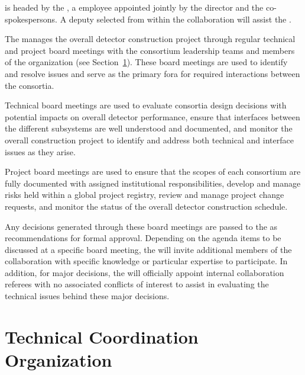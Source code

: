  is headed by the ,  a 
employee appointed jointly by the  director 
and the  co-spokespersons. %
A deputy   selected from within the collaboration will assist the .

The  manages the overall detector construction 
project through regular technical and project board meetings with 
the consortium leadership teams and members of the  
organization (see Section~\ref{sec:tco}).  These board meetings 
are used to identify and resolve issues and serve as the primary 
fora for required interactions between the consortia.

Technical board meetings are used to evaluate consortia design
decisions with potential impacts on overall detector performance,
ensure that interfaces between the different subsystems are well
understood and documented, and monitor the overall construction
project to identify and address both technical and interface 
issues as they arise.

Project board meetings are used to ensure that the scopes of 
each consortium are fully documented with assigned institutional
responsibilities, develop and manage risks held within a global
project registry, review and manage project change requests, and
monitor the status of the overall detector construction schedule.

Any decisions generated through these board meetings are passed to 
the   as recommendations for formal approval.
Depending on the agenda items to be discussed at a specific board
meeting, the  will invite additional members of the
collaboration with specific knowledge or particular expertise to
participate.  In addition, for major decisions, the 
will officially appoint internal collaboration referees with no associated 
conflicts of interest to %
assist in evaluating the 
 technical issues behind these major decisions.

\section{Technical Coordination Organization}
\label{sec:tco}

